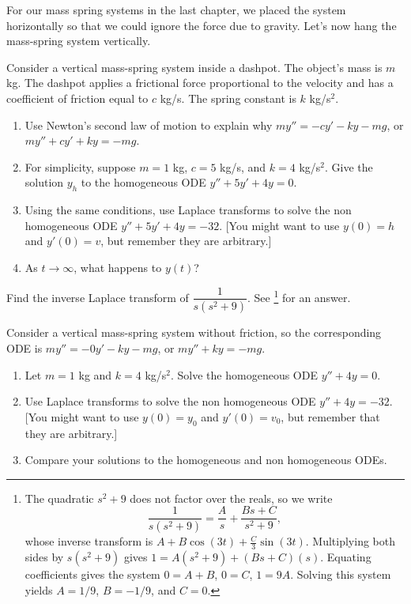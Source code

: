 For our mass spring systems in the last chapter, we placed the system horizontally so that we could ignore the force due to gravity.  Let's now hang the mass-spring system vertically. 

\begin{problem}
 Consider a vertical mass-spring system inside a dashpot. The object's mass is $m$ kg. The dashpot applies a frictional force proportional to the velocity and has a coefficient of friction equal to $c$ kg/s. The spring constant is $k$ kg/s$^2$.  
\begin{enumerate}
 \item Use Newton's second law of motion to explain why $my''=-cy'-ky-mg$, or $my''+cy'+ky=-mg$.
 \item For simplicity, suppose $m=1$ kg, $c=5$ kg/s, and $k=4$ kg/s$^2$. Give the solution $y_h$ to the homogeneous ODE $y''+5y'+4y=0$.
 \item{}%
Using the same conditions, use Laplace transforms to solve the non homogeneous ODE $y''+5y'+4y=-32$. [You might want to use $y(0)=h$ and $y'(0)=v$, but remember they are arbitrary.]
 \item As $t\to \infty$, what happens to $y(t)$?
\end{enumerate}
\end{problem}

\begin{review*}
Find the inverse Laplace transform of $\dfrac{1}{s(s^2+9)}$. See \footnote{
The quadratic $s^2+9$ does not factor over the reals, so we write
$$\dfrac{1}{s(s^2+9)} = \frac{A}{s}+\frac{Bs+C}{s^2+9},$$
whose inverse transform is $A+B\cos(3t)+\frac{C}{3}\sin(3t)$. 
Multiplying both sides by $s(s^2+9)$ gives $1=A(s^2+9)+(Bs+C)(s)$.  Equating coefficients gives the system $0=A+B$, $0=C$, $1=9A$. Solving this system yields $A=1/9$, $B=-1/9$, and $C=0$.
} for an answer.
\end{review*}


\begin{problem}
 Consider a vertical mass-spring system without friction, so the corresponding ODE is $my''=-0y'-ky-mg$, or $my''+ky=-mg$. 
\begin{enumerate}
 \item Let $m=1$ kg and $k=4$ kg/s$^2$. Solve the homogeneous ODE $y''+4y=0$.
 \item{}%
Use Laplace transforms to solve the non homogeneous ODE $y''+4y=-32$. [You might want to use $y(0)=y_0$ and $y'(0)=v_0$, but remember that they are arbitrary.]
 \item Compare your solutions to the homogeneous and non homogeneous ODEs.
\end{enumerate} 
\end{problem}


